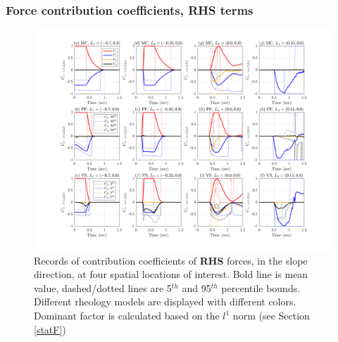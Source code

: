 \documentclass{article}
\begin{document}
\subsubsection{Force contribution coefficients, RHS terms}
\begin{figure}[H]
         \centering
        \includegraphics[width=1\textwidth]{NewTest/Ci_x.png}
        \caption{Records of contribution coefficients of \textbf{RHS} forces, in the slope direction, at four spatial locations of interest. Bold line is mean value, dashed/dotted lines are 5$^{th}$ and 95$^{th}$ percentile bounds. Different rheology models are displayed with different colors. Dominant factor is calculated based on the $l^1$ norm (see Section \ref{statF})}
        \label{fig:Ci_x}
\end{figure}
\end{document}
